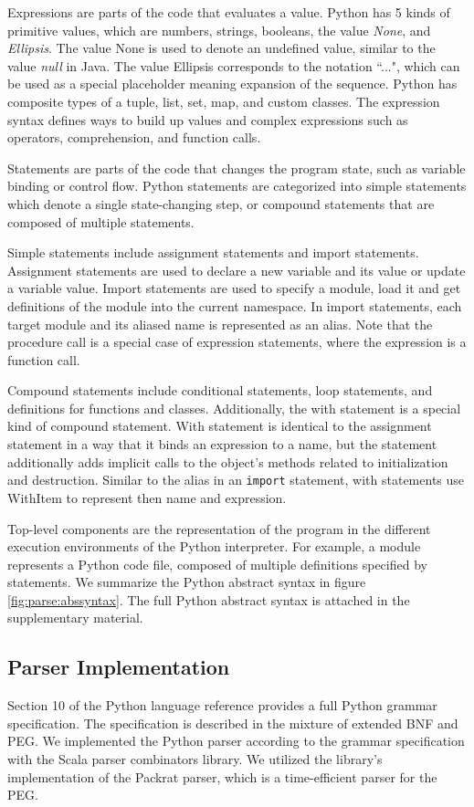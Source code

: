 Expressions are parts of the code that evaluates a value.
Python has 5 kinds of primitive values, 
which are numbers, strings, booleans, the value {\itshape None}, and {\itshape Ellipsis}.
The value None is used to denote an undefined value,
similar to the value {\itshape null} in Java.
The value Ellipsis corresponds to the notation ``...",
which can be used as a special placeholder meaning expansion of the sequence. 
Python has composite types of a tuple, list, set, map, and custom classes.
The expression syntax defines ways to build up values
and complex expressions such as operators, comprehension, and function calls. 

Statements are parts of the code that changes the program state,
such as variable binding or control flow. 
Python statements are categorized into 
simple statements which denote a single state-changing step, 
or compound statements that are composed of multiple statements.

Simple statements include assignment statements and import statements.
Assignment statements are used to declare a new variable and its value
or update a variable value.
Import statements are used to specify a module, load it
and get definitions of the module into the current namespace.
In import statements, each target module and its aliased name is represented
as an alias.   
Note that the procedure call is a special case of expression statements,
where the expression is a function call.

Compound statements include conditional statements, loop statements,
and definitions for functions and classes.
Additionally, the with statement is a special kind of compound statement.
With statement is identical to the assignment statement 
in a way that it binds an expression to a name, 
but the statement additionally adds implicit calls
to the object's methods related to initialization and destruction.
Similar to the alias in an {\tt import} statement,
with statements use WithItem to represent then name and expression.

Top-level components are the representation of the program
in the different execution environments of the Python interpreter.
For example, a module represents a Python code file, composed of
multiple definitions specified by statements. 
We summarize the Python abstract syntax in figure \ref{fig:parse:abssyntax}.
The full Python abstract syntax is attached in the supplementary material.

\subsection{Parser Implementation}

Section 10 of the Python language reference\cite{pythonref}
provides a full Python grammar specification.
The specification is described in the mixture of 
extended BNF and PEG\cite{bryan2004peg}. We implemented the Python parser
according to the grammar specification with the Scala parser combinators 
library\cite{scalaparser}. We utilized the library's implementation of
the Packrat parser\cite{bryan02packrat}, which is a time-efficient parser
for the PEG.

